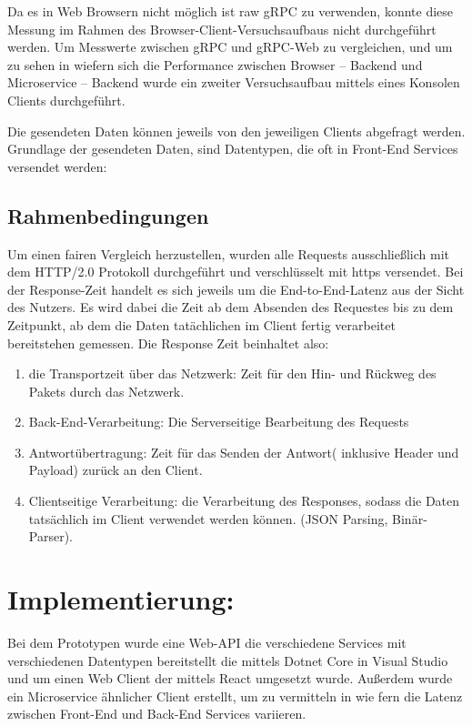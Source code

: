 Da es in Web Browsern nicht möglich ist raw gRPC zu verwenden, konnte diese Messung im Rahmen des Browser-Client-Versuchsaufbaus nicht durchgeführt werden. Um Messwerte zwischen gRPC und gRPC-Web zu vergleichen, und um zu sehen in wiefern sich die Performance zwischen Browser – Backend und Microservice – Backend wurde ein zweiter Versuchsaufbau mittels eines Konsolen Clients durchgeführt.

Die gesendeten Daten können jeweils von den jeweiligen Clients abgefragt werden. Grundlage der gesendeten Daten, sind Datentypen, die oft in Front-End Services versendet werden:

\subsection*{Rahmenbedingungen}
Um einen fairen Vergleich herzustellen, wurden alle Requests ausschließlich mit dem HTTP/2.0 Protokoll durchgeführt und verschlüsselt mit https versendet. Bei der Response-Zeit handelt es sich jeweils um die End-to-End-Latenz aus der Sicht des Nutzers. Es wird dabei die Zeit ab dem Absenden des Requestes bis zu dem Zeitpunkt, ab dem die Daten tatächlichen im Client fertig verarbeitet bereitstehen gemessen. Die Response Zeit beinhaltet also: 

\begin{enumerate}
	\item die Transportzeit über das Netzwerk:
	Zeit für den Hin- und Rückweg des Pakets durch das Netzwerk.
	
	\item Back-End-Verarbeitung:
	Die Serverseitige Bearbeitung des Requests
	
	\item Antwortübertragung:
	Zeit für das Senden der Antwort( inklusive Header und Payload) zurück an den Client.
	
	\item Clientseitige Verarbeitung:
	die Verarbeitung des Responses, sodass die Daten tatsächlich im Client verwendet werden können. (JSON Parsing, Binär-Parser).
	
\end{enumerate}

\clearpage
\section{Implementierung:}

Bei dem Prototypen wurde eine Web-API die verschiedene Services mit verschiedenen Datentypen bereitstellt die mittels Dotnet Core in Visual Studio und um einen Web Client der mittels React umgesetzt wurde. Außerdem wurde ein Microservice ähnlicher Client erstellt, um zu vermitteln in wie fern die Latenz zwischen Front-End und Back-End Services variieren.


